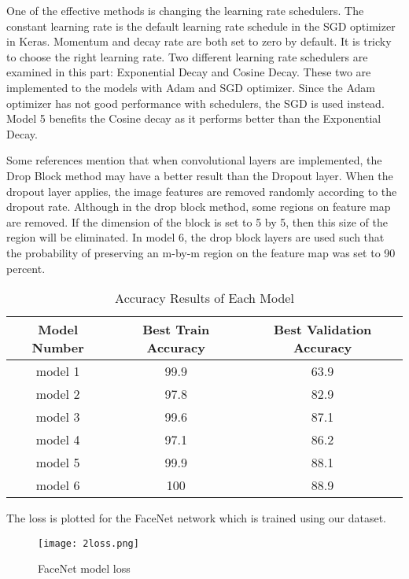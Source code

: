 One of the effective methods is changing the learning rate schedulers. The constant learning rate is the default learning rate schedule in the SGD optimizer in Keras. Momentum and decay rate are both set to zero by default. It is tricky to choose the right learning rate. Two different learning rate schedulers are examined in this part: Exponential Decay and Cosine Decay. These two are implemented to the models with Adam and SGD optimizer. Since the Adam optimizer has not good performance with schedulers, the SGD is used instead. Model 5 benefits the Cosine decay as it performs better than the Exponential Decay. 

Some references mention that when convolutional layers are implemented, the Drop Block method may have a better result than the Dropout layer. When the dropout layer applies, the image features are removed randomly according to the dropout rate. Although in the drop block method, some regions on feature map are removed. If the dimension of the block is set to 5 by 5, then this size of the region will be eliminated. In model 6, the drop block layers are used such that the probability of preserving an m-by-m region on the feature map was set to 90 percent.

\begin{table}[h]
	\centering
	\begin{tabular}{ |c||c|c|  }
		\hline
		Model Number& Best Train Accuracy &Best Validation Accuracy\\
		\hline
		model 1 & 99.9 & 63.9 \\
		model 2 & 97.8 & 82.9 \\
		model 3 & 99.6 & 87.1 \\
		model 4 & 97.1 & 86.2 \\
		model 5 & 99.9 & 88.1 \\
		model 6 & 100 & 88.9 \\
		\hline
	\end{tabular}
	\caption{Accuracy Results of Each Model}
	\label{table:t1}
\end{table}

The loss is plotted for the FaceNet network which is trained using our dataset. 

\begin{figure}[!h]
	\centering
	\texttt{[image: 2loss.png]}
	\caption{FaceNet model loss}
	\label{fig:f2}
\end{figure}

